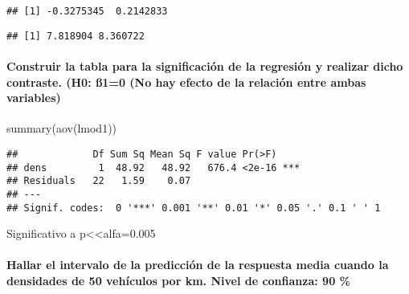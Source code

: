 \documentclass[
]{article}
\newenvironment{Shaded}{\begin{snugshade}}{\end{snugshade}}
\newcommand{\CommentTok}[1]{\textcolor[rgb]{0.56,0.35,0.01}{\textit{#1}}}
\newcommand{\DecValTok}[1]{\textcolor[rgb]{0.00,0.00,0.81}{#1}}
\newcommand{\FunctionTok}[1]{\textcolor[rgb]{0.00,0.00,0.00}{#1}}
\newcommand{\NormalTok}[1]{#1}
\newcommand{\SpecialCharTok}[1]{\textcolor[rgb]{0.00,0.00,0.00}{#1}}
\begin{document}
\begin{verbatim}
## [1] -0.3275345  0.2142833
\end{verbatim}

\begin{Shaded}
\end{Shaded}

\begin{verbatim}
## [1] 7.818904 8.360722
\end{verbatim}

\hypertarget{construir-la-tabla-para-la-significaciuxf3n-de-la-regresiuxf3n-y-realizar-dicho-contraste.-h0-uxdf10-no-hay-efecto-de-la-relaciuxf3n-entre-ambas-variables}{%
\paragraph{Construir la tabla para la significación de la regresión y
realizar dicho contraste. (H0: ß1=0 (No hay efecto de la relación entre
ambas
variables)}\label{construir-la-tabla-para-la-significaciuxf3n-de-la-regresiuxf3n-y-realizar-dicho-contraste.-h0-uxdf10-no-hay-efecto-de-la-relaciuxf3n-entre-ambas-variables}}

\begin{Shaded}
\begin{Highlighting}[]
\FunctionTok{summary}\NormalTok{(}\FunctionTok{aov}\NormalTok{(lmod1))}
\end{Highlighting}
\end{Shaded}

\begin{verbatim}
##             Df Sum Sq Mean Sq F value Pr(>F)    
## dens         1  48.92   48.92   676.4 <2e-16 ***
## Residuals   22   1.59    0.07                   
## ---
## Signif. codes:  0 '***' 0.001 '**' 0.01 '*' 0.05 '.' 0.1 ' ' 1
\end{verbatim}

Significativo a p\textless\textless alfa=0.005

\hypertarget{hallar-el-intervalo-de-la-predicciuxf3n-de-la-respuesta-media-cuando-la-densidades-de-50-vehuxedculos-por-km.-nivel-de-confianza-90}{%
\paragraph{Hallar el intervalo de la predicción de la respuesta media
cuando la densidades de 50 vehículos por km. Nivel de confianza: 90
\%}\label{hallar-el-intervalo-de-la-predicciuxf3n-de-la-respuesta-media-cuando-la-densidades-de-50-vehuxedculos-por-km.-nivel-de-confianza-90}}
\end{document}
